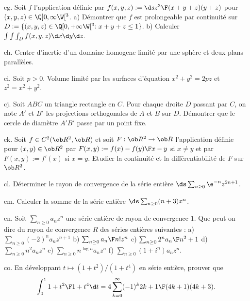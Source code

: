 \exo [Level=2,Fight=2,Learn=1,Field=\IntégralesMultiples|\FonctionsDePlusieursVariables,Type=\Exercices,Origin=]  cg. 
Soit $f$ l'application 
définie par $f(x,y,z):=\d s{z^3\F (x+y+z)(y+z)}$ pour $(x,y,z)\in\Q]0,\infty\W[^3$. \pn
a) Démontrer que $f$ est prolongeable par continuité sur 
$D:=\{(x,y,z)\in\Q[0,+\infty\W[^3:x+y+z\le 1\}$. \pn
b) Calculer $\int\int\int_Df(x,y,z)\d x\d y\d z$. 

\exo [Level=2,Fight=2,Learn=1,Field=\IntégralesMultiples,Type=\Exercices,Origin=] ch. 
Centre d'inertie d'un domaine homogene limité 
par une sphère et deux plans parallèles. 

\exo [Level=2,Fight=2,Learn=1,Field=\Volumes,Type=\Exercices,Origin=] ci. 
Soit $p>0$. 
Volume limité par les surfaces d'équation $x^2+y^2=2pz$ et $z^2=x^2+y^2$. 

\exo [Level=1,Fight=2,Learn=1,Field=\GéométriePlane,Type=\Exercices,Origin=]  cj. 
Soit $ABC$ un triangle rectangle en $C$. Pour chaque droite $D$ passant par $C$, 
on note $A'$ et $B'$ les projections orthogonales de $A$ et $B$ sur $D$. 
Démontrer que le cercle de diamètre $A'B'$ passe par un point fixe. 

\exo [Level=2,Fight=2,Learn=1,Field=\FonctionsDePlusieursVariables,Type=\Exercices,Origin=] ck. 
Soit $f\in\sc C^2(\ob R^2,\ob R)$ et soit $F:\ob R^2\to\ob R$ l'application 
définie pour $(x,y)\in\ob R^2$ par 
$F(x,y):={f(x)-f(y)\F x-y}$ si $x\neq y$ et par $F(x,y):=f'(x)$ si $x=y$. 
Etudier la continuité et la différentiabilité de $F$ sur $\ob R^2$. 

\exo [Level=2,Fight=0,Learn=0,Field=\SériesEntières,Type=\Exercices,Origin=] cl. 
Déterminer le rayon de convergence de la  série entière $\ds\sum_{n\ge0}\e^{-n}z^{2n+1}$. 

\exo [Level=2,Fight=1,Learn=0,Field=\SériesEntières,Type=\Exercices,Origin=] cm. 
Calculer la somme de la série entière $\ds\sum_{n\ge0}(n+3)x^n$.


\exo [Level=2,Fight=1,Learn=0,Field=\SériesEntières,Type=\Exercices,Origin=] cn. 
Soit $\sum_{n\ge0}a_nz^n$ une série entière de rayon de convergence $1$. 
Que peut on dire du rayon de convergence $R$ des séries entières suivantes : \pn
a) $\sum_{n\ge0}(-2)^na_nz^{n+1}$\qquad
b) $\sum_{n\ge0}{a_n\F n!}z^n$\qquad
c) $\sum_{n\ge0}{2^na_n\F n^2+1}$\qquad
d) $\sum_{n\ge0}n^2a_nz^n$\qquad
e) $\sum_{n\ge0}n^{\log n}a_n z^n$\qquad
f) $\sum_{n\ge0}(1+i^n)a_nz^n$. 

\exo [Level=2,Fight=2,Learn=2,Field=\SériesEntières,Type=\Exercices,Origin=] co. 
En développant $t\mapsto(1+t^2)/(1+t^4)$ en série entière, prouver que 
$$
\int_0^1{1+t^2\F1+t^4}\d t=4\sum_{k=0}^\infty(-1)^k{2k+1\F(4k+1)(4k+3)}.
$$

